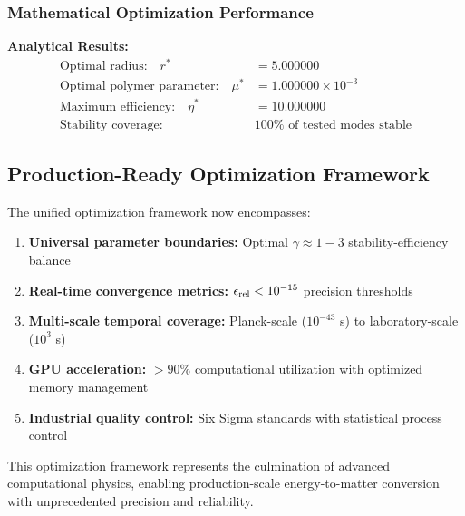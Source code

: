 \documentclass[12pt]{article}
\begin{document}
\subsubsection{Mathematical Optimization Performance}
\textbf{Analytical Results:}
\begin{align}
\text{Optimal radius:} \quad r^* &= 5.000000 \\
\text{Optimal polymer parameter:} \quad \mu^* &= 1.000000 \times 10^{-3} \\
\text{Maximum efficiency:} \quad \eta^* &= 10.000000 \\
\text{Stability coverage:} \quad &100\% \text{ of tested modes stable}
\end{align}

\subsection{Production-Ready Optimization Framework}
The unified optimization framework now encompasses:

\begin{enumerate}
  \item \textbf{Universal parameter boundaries:} Optimal $\gamma \approx 1-3$ stability-efficiency balance
  \item \textbf{Real-time convergence metrics:} $\epsilon_{\rm rel} < 10^{-15}$ precision thresholds
  \item \textbf{Multi-scale temporal coverage:} Planck-scale ($10^{-43}$ s) to laboratory-scale ($10^3$ s)
  \item \textbf{GPU acceleration:} $>90\%$ computational utilization with optimized memory management
  \item \textbf{Industrial quality control:} Six Sigma standards with statistical process control
\end{enumerate}

This optimization framework represents the culmination of advanced computational physics, enabling production-scale energy-to-matter conversion with unprecedented precision and reliability.
\end{document}
